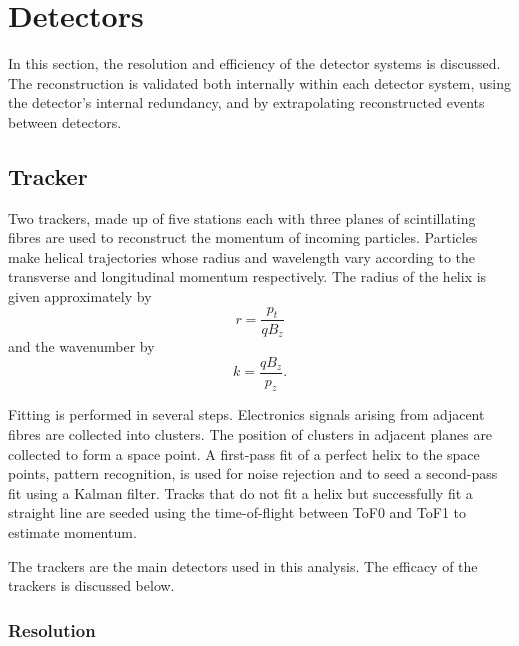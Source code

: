 \section{Detectors}
\label{Sect:Detectors}

In this section, the resolution and efficiency of the detector systems is
discussed. The reconstruction is validated both internally within each
detector system, using the detector's internal redundancy, and by extrapolating
reconstructed events between detectors.

\subsection{Tracker}

Two trackers, made up of five stations each with three planes of scintillating
fibres are used to reconstruct the momentum of incoming particles. Particles 
make helical trajectories whose radius and wavelength vary according to the
transverse and longitudinal momentum respectively. The radius of the helix is
given approximately by
\begin{equation}
\label{eq:scifi_helix_radius}
r = \frac{p_t}{q B_z}
\end{equation}
and the wavenumber by
\begin{equation}
\label{eq:scifi_helix_wavenumber}
k = \frac{q B_z}{p_z}.
\end{equation}

Fitting is performed in several steps. Electronics signals arising from adjacent
fibres are collected into clusters. The position of clusters in adjacent planes 
are collected to form a space point. A first-pass fit of a perfect helix to the 
space points, pattern recognition, is used for noise rejection and to seed a 
second-pass fit using a Kalman filter. Tracks that do not fit a helix but 
successfully fit a straight line are seeded using the time-of-flight between
ToF0 and ToF1 to estimate momentum.

The trackers are the main detectors used in this analysis. The efficacy of the
trackers is discussed below.

\subsubsection{Resolution}

